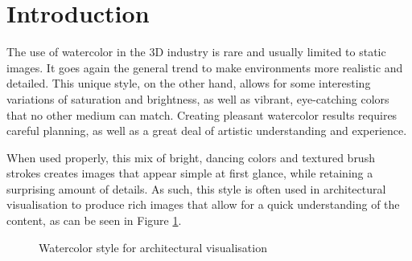 \documentclass{article}
\begin{document}
\section{Introduction}

The use of watercolor in the 3D industry is rare and usually limited to static images. 
It  goes again the general trend to make environments more realistic and detailed. This unique style, 
on the other hand, allows for some interesting variations of saturation and brightness, as well as vibrant, 
eye-catching colors that no other medium can match. Creating pleasant watercolor results requires 
careful planning, as well as a great deal of artistic understanding and experience. \medskip \par

\noindent
When used properly, this mix of bright, dancing colors and textured brush strokes creates images that appear 
simple at first glance, while retaining a surprising amount of details. As such, this style is often used in
architectural visualisation to produce rich images that allow for a quick understanding of the content, as can 
be seen in Figure \ref{fig:watercolor_architecture}.

\begin{figure}[h]
    \centering
    \hfill
    \caption{Watercolor style for architectural visualisation}
    \label{fig:watercolor_architecture}
\end{figure}
\end{document}
